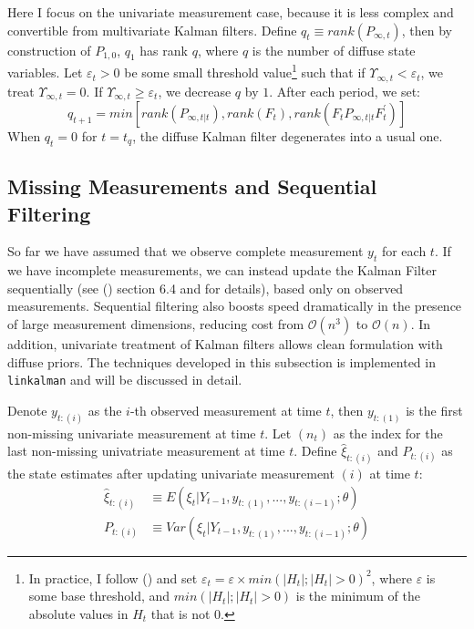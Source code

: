 \documentclass[10pt]{article}
\numberwithin{equation}{section}
\begin{document}
Here I focus on the univariate measurement case, because it is less complex and convertible from multivariate Kalman filters. Define $q_t\equiv rank(P_{\infty,t})$, then by construction of $P_{1,0}$, $q_1$ has rank $q$, where $q$ is the number of diffuse state variables. Let $\varepsilon_t>0$ be some small threshold value\footnote{In practice, I follow (\cite{helske_2016}) and set $\varepsilon_t=\varepsilon\times min(|H_t|;|H_t|>0)^2$,  where $\varepsilon$ is some base threshold, and $min(|H_t|;|H_t|>0)$ is the minimum of the absolute values in $H_t$ that is not $0$.} such that if $\Upsilon_{\infty,t}<\varepsilon_t$, we treat $\Upsilon_{\infty,t}=0$. If $\Upsilon_{\infty,t}\geq \varepsilon_t$, we decrease $q$ by $1$. After each period, we set: 
\[
    q_{t+1}=min[rank(P_{\infty,t|t}),rank(F_t), rank(F_tP_{\infty,t|t}F_t^{'})]
\]
When $q_{t}=0$ for $t=t_q$, the diffuse Kalman filter degenerates into a usual one. 

\subsection{Missing Measurements and Sequential Filtering} \label{subsec:seq_filter}
So far we have assumed that we observe complete measurement $y_t$ for each $t$. If we have incomplete measurements, we can instead update the Kalman Filter sequentially (see (\cite{durbin_koopman_2001}) section 6.4 and \cite{durbin_koopman_2000} for details), based only on observed measurements. Sequential filtering also boosts speed dramatically in the presence of large measurement dimensions, reducing cost from $\mathcal{O}(n^3)$ to $\mathcal{O}(n)$. In addition, univariate treatment of Kalman filters allows clean formulation with diffuse priors. The techniques developed in this subsection is implemented in \texttt{linkalman} and will be discussed in detail. 

Denote $y_{t:(i)}$ as the $i$-th observed measurement at time $t$, then $y_{t:(1)}$ is the first non-missing univariate measurement at time $t$. Let $(n_t)$ as the index for the last non-missing univatriate measurement at time $t$. Define $\hat{\xi}_{t:(i)}$ and $P_{t:(i)}$ as the state estimates after updating univariate measurement $(i)$ at time $t$:
\begin{align*}
    \hat{\xi}_{t:(i)} &\equiv E(\xi_t|Y_{t-1},y_{t:(1)},...,y_{t:(i-1)};\theta) \\
    P_{t:(i)} &\equiv Var(\xi_t|Y_{t-1},y_{t:(1)},...,y_{t:(i-1)};\theta) 
\end{align*}
\end{document}
